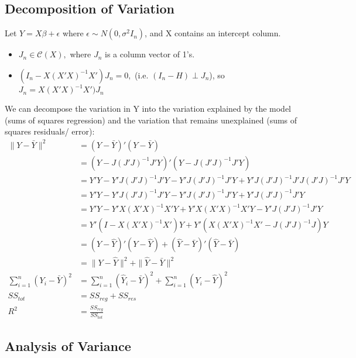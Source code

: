 \documentclass[12pt]{article}\usepackage{graphicx, color}
\theoremstyle{definition}
\renewcommand{\hat}{\widehat}
\begin{document}
\subsection{Decomposition of Variation}
Let $Y=X\beta+\epsilon$ where $\epsilon\sim N(0,\sigma^2I_n)$, and X contains an intercept column. 
\begin{itemize}
\item $J_n\in\mathcal{C}(X),$ where $J_n$ is a column vector of 1's. 
\item $(I_n-X(X'X)^{-1}X')J_n=0,$ (i.e. $(I_n-H)\perp J_n$), so $J_n=X(X'X)^{-1}X')J_n$
\end{itemize}
We can decompose the variation in Y into the variation explained by the model (sums of squares regression) and the variation that remains unexplained (sums of squares residuals/ error):
\begin{align*}\|Y-\bar Y\|^2&=(Y-\bar Y)'(Y-\bar Y)\\
&=(Y-J(J'J)^{-1}J'Y)'(Y-J(J'J)^{-1}J'Y)\\
&=Y'Y-Y'J(J'J)^{-1}J'Y-Y'J(J'J)^{-1}J'Y+Y'J(J'J)^{-1}J'J(J'J)^{-1}J'Y\\
&=Y'Y-Y'J(J'J)^{-1}J'Y-Y'J(J'J)^{-1}J'Y+Y'J(J'J)^{-1}J'Y\\
&=Y'Y-Y'X(X'X)^{-1}X'Y+Y'X(X'X)^{-1}X'Y-Y'J(J'J)^{-1}J'Y\\
&=Y'(I-X(X'X)^{-1}X')Y+Y'(X(X'X)^{-1}X'-J(J'J)^{-1}J)Y\\
&=(Y-\hat Y)'(Y-\hat Y)+(\hat Y-\bar Y)'(\hat Y-\bar Y)\\
&=\|Y-\hat Y\|^2+ \|\hat Y-\bar Y\|^2\\
\sum_{i=1}^n(Y_i-\bar Y)^2&=\sum_{i=1}^n(\hat Y_i-\bar Y)^2+\sum_{i=1}^n(Y_i-\hat Y)^2\\
SS_{tot}&=SS_{reg}+SS_{res}\\
R^2&=\frac{SS_{reg}}{SS_{tot}}
\end{align*}
\subsection{Analysis of Variance}
\end{document}
